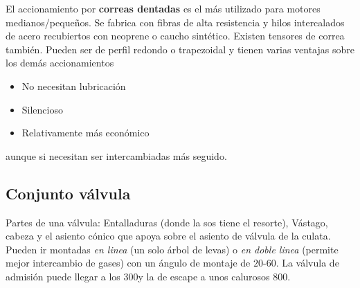 El accionamiento por \textbf{correas dentadas} es el más utilizado para motores medianos/pequeños. Se fabrica con fibras de alta resistencia y hilos intercalados de acero recubiertos con neoprene o caucho sintético. Existen tensores de correa también. Pueden ser de perfil redondo o trapezoidal y tienen varias ventajas sobre los demás accionamientos

\begin{itemize}
    \item No necesitan lubricación
    \item Silencioso
    \item Relativamente más económico
\end{itemize}
aunque si necesitan ser intercambiadas más seguido.








\subsection{Conjunto válvula}
Partes de una válvula: Entalladuras (donde la sos tiene el resorte), Vástago, cabeza y el asiento cónico que apoya sobre el asiento de válvula de la culata. Pueden ir montadas \textit{en linea} (un solo árbol de levas) o \textit{en doble linea} (permite mejor intercambio de gases) con un ángulo de montaje de $20$-$60$\grad. La válvula de admisión puede llegar a los 300\grad y la de escape a unos calurosos 800\grad.

